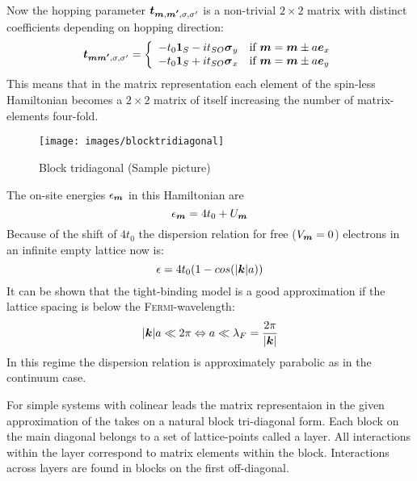 Now the hopping parameter $\boldsymbol{t}_{\boldsymbol{m},\boldsymbol{m'},\sigma,\sigma '}$ is a non-trivial $2 \times 2$ matrix with distinct coefficients depending on hopping direction:
\begin{align}
	\boldsymbol{t}_{\boldsymbol{m}\boldsymbol{m'},\sigma,\sigma '} = \left\{ \begin{array}[c]{cl} -t_0\boldsymbol{1}_S - i t_{SO} \boldsymbol{\sigma}_y & \text{if } \boldsymbol{m} = \boldsymbol{m} \pm a \boldsymbol{e}_{x} \\
		-t_0\boldsymbol{1}_S + i t_{SO} \boldsymbol{\sigma}_x & \text{if } \boldsymbol{m} = \boldsymbol{m} \pm a \boldsymbol{e}_{y} \end{array} \right.
	\label{eqn:tsohopping}
\end{align}
This means that in the matrix representation each element of the spin-less Hamiltonian becomes a $2 \times 2$ matrix of itself increasing the number of matrix-elements four-fold.
\begin{figure}[h!]
\centering
\texttt{[image: images/blocktridiagonal]}
\caption{Block tridiagonal (Sample picture)}
\label{fig:blocktridiagonal}
\end{figure}
The on-site energies $\epsilon_{\boldsymbol{m}}$ in this Hamiltonian are
\begin{equation}
\epsilon_{\boldsymbol{m}} = 4t_0 + U_{\boldsymbol{m}} 
\end{equation}
Because of the shift of $4 t_0$ the dispersion relation for free ($V_{\boldsymbol{m}}=0$) electrons in an infinite empty lattice now is:
\begin{equation}
\epsilon = 4t_0(1-cos(\lvert\boldsymbol{k}\rvert a))
\end{equation}
It can be shown that the tight-binding model is a good approximation if the lattice spacing is below the \textsc{Fermi}-wavelength:
\begin{equation}
\lvert\boldsymbol{k}\rvert a \ll  2\pi \Leftrightarrow a \ll \lambda_F = \frac{2\pi}{\lvert\boldsymbol{k}\rvert}
\end{equation}
In this regime the dispersion relation is approximately parabolic as in the continuum case.\cite{Metalidis2007Thesis}

For simple systems with colinear leads the matrix representaion in the given approximation of the \hamil{} takes on a natural block tri-diagonal form. Each block on the main diagonal belongs to a set of lattice-points called a layer. All interactions within the layer correspond to matrix elements within the block. Interactions across layers are found in blocks on the first off-diagonal\cite{AnLunNik2008}.
